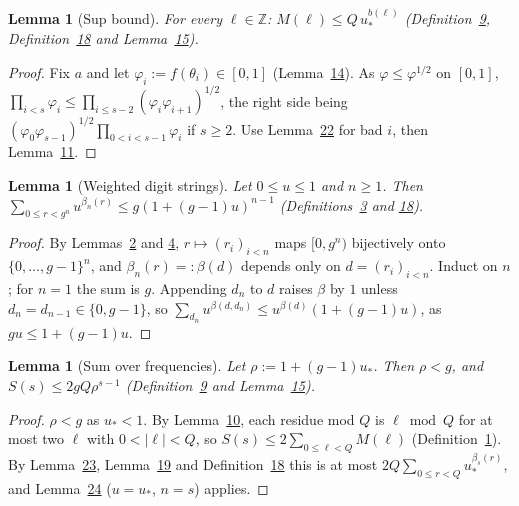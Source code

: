 \documentclass[11pt]{article}
\newcounter{hffc}
\theoremstyle{definition}\newtheorem{hffdef}[hffc]{Definition}
\theoremstyle{plain}\newtheorem{hfflem}[hffc]{Lemma}\newtheorem{hffthm}[hffc]{Theorem}
\theoremstyle{remark}\newtheorem{hffrem}[hffc]{Remark}
\newcommand{\hffcost}{}
\newcommand{\setcost}[1]{\renewcommand{\hffcost}{#1}}
\newcommand{\Z}{\mathbb{Z}}\newcommand{\R}{\mathbb{R}}\newcommand{\N}{\mathbb{N}}
\begin{document}
\begin{hfflem}[Sup bound]\label{L:sup}
For every $\ell\in\Z$: $M(\ell)\le Q\,u_*^{b(\ell)}$ (Definition~\hyperref[D:psi]{9}, Definition~\hyperref[D:bad]{18} and Lemma~\hyperref[L:gap]{15}).
\par\nopagebreak{}
\end{hfflem}
\begin{proof}\setcost{length 147/300}Fix $a$ and let $\varphi_i:=f(\theta_i)\in[0,1]$ (Lemma~\hyperref[L:f]{14}). As $\varphi\le\varphi^{1/2}$ on $[0,1]$, $\prod_{i<s}\varphi_i\le\prod_{i\le s-2}(\varphi_i\varphi_{i+1})^{1/2}$, the right side being $(\varphi_0\varphi_{s-1})^{1/2}\prod_{0<i<s-1}\varphi_i$ if $s\ge2$. Use Lemma~\hyperref[L:badprod]{22} for bad $i$, then Lemma~\hyperref[L:prod]{11}.
\end{proof}

\begin{hfflem}[Weighted digit strings]\label{L:strings}
Let $0\le u\le1$ and $n\ge1$. Then $\sum_{0\le r<g^n}u^{\beta_n(r)}\le g(1+(g-1)u)^{n-1}$ (Definitions~\hyperref[D:digits]{3} and \hyperref[D:bad]{18}).
\par\nopagebreak{}
\end{hfflem}
\begin{proof}\setcost{length 213/300}By Lemmas~\hyperref[L:digits]{2} and \hyperref[L:window]{4}, $r\mapsto(r_i)_{i<n}$ maps $[0,g^n)$ bijectively onto $\{0,\dots,g-1\}^n$, and $\beta_n(r)=:\beta(d)$ depends only on $d=(r_i)_{i<n}$. Induct on $n$; for $n=1$ the sum is $g$. Appending $d_n$ to $d$ raises $\beta$ by $1$ unless $d_n=d_{n-1}\in\{0,g-1\}$, so $\sum_{d_n}u^{\beta(d,d_n)}\le u^{\beta(d)}(1+(g-1)u)$, as $gu\le1+(g-1)u$.
\end{proof}

\begin{hfflem}[Sum over frequencies]\label{L:twsum}
Let $\rho:=1+(g-1)u_*$. Then $\rho<g$, and $S(s)\le2gQ\rho^{s-1}$ (Definition~\hyperref[D:psi]{9} and Lemma~\hyperref[L:gap]{15}).
\par\nopagebreak{}
\end{hfflem}
\begin{proof}\setcost{length 185/300}$\rho<g$ as $u_*<1$. By Lemma~\hyperref[L:per]{10}, each residue mod $Q$ is $\ell\bmod Q$ for at most two $\ell$ with $0<|\ell|<Q$, so $S(s)\le2\sum_{0\le\ell<Q}M(\ell)$ (Definition~\hyperref[D:conv]{1}). By Lemma~\hyperref[L:sup]{23}, Lemma~\hyperref[L:twist]{19} and Definition~\hyperref[D:bad]{18} this is at most $2Q\sum_{0\le r<Q}u_*^{\beta_s(r)}$, and Lemma~\hyperref[L:strings]{24} ($u=u_*$, $n=s$) applies.
\end{proof}
\end{document}
